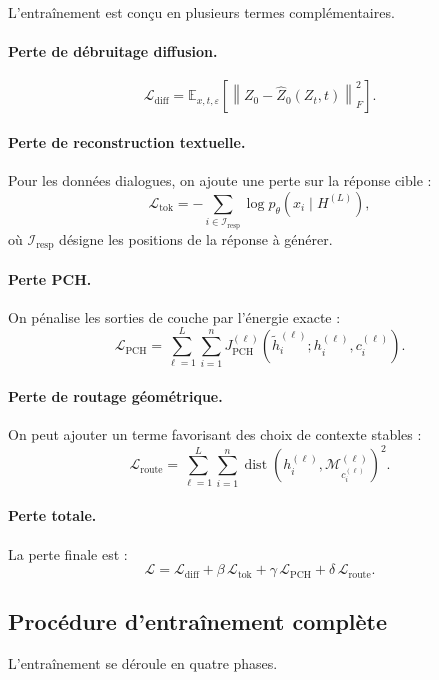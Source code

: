 \documentclass[11pt]{article}
\begin{document}
L'entraînement est conçu en plusieurs termes complémentaires.

\paragraph{Perte de débruitage diffusion.}
\[
\mathcal L_{\mathrm{diff}}
=
\mathbb E_{x,t,\varepsilon}
\left[
\left\|
Z_0-\widehat Z_0(Z_t,t)
\right\|_F^2
\right].
\]

\paragraph{Perte de reconstruction textuelle.}
Pour les données dialogues, on ajoute une perte sur la réponse cible :
\[
\mathcal L_{\mathrm{tok}}
=
-\sum_{i\in \mathcal I_{\mathrm{resp}}}
\log p_\theta(x_i \mid H^{(L)}),
\]
où \(\mathcal I_{\mathrm{resp}}\) désigne les positions de la réponse à générer.

\paragraph{Perte PCH.}
On pénalise les sorties de couche par l'énergie exacte :
\[
\mathcal L_{\mathrm{PCH}}
=
\sum_{\ell=1}^L\sum_{i=1}^n
J_{\mathrm{PCH}}^{(\ell)}\!\left(
\tilde h_i^{(\ell)};
h_i^{(\ell)},
c_i^{(\ell)}
\right).
\]

\paragraph{Perte de routage géométrique.}
On peut ajouter un terme favorisant des choix de contexte stables :
\[
\mathcal L_{\mathrm{route}}
=
\sum_{\ell=1}^L\sum_{i=1}^n
\operatorname{dist}\!\left(h_i^{(\ell)},\mathcal M_{c_i^{(\ell)}}^{(\ell)}\right)^2.
\]

\paragraph{Perte totale.}
La perte finale est :
\[
\mathcal L
=
\mathcal L_{\mathrm{diff}}
+
\beta\,\mathcal L_{\mathrm{tok}}
+
\gamma\,\mathcal L_{\mathrm{PCH}}
+
\delta\,\mathcal L_{\mathrm{route}}.
\]

\subsection{Procédure d'entraînement complète}

L'entraînement se déroule en quatre phases.
\end{document}
